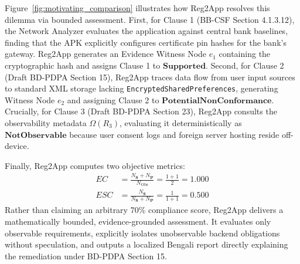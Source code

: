 Figure~\ref{fig:motivating_comparison} illustrates how Reg2App resolves this dilemma via bounded assessment. First, for Clause 1 (BB-CSF Section 4.1.3.12), the Network Analyzer evaluates the application against central bank baselines, finding that the APK explicitly configures certificate pin hashes for the bank's gateway. Reg2App generates an Evidence Witness Node $e_1$ containing the cryptographic hash and assigns Clause 1 to $\mathbf{Supported}$. Second, for Clause 2 (Draft BD-PDPA Section 15), Reg2App traces data flow from user input sources to standard XML storage lacking \texttt{EncryptedSharedPreferences}, generating Witness Node $e_2$ and assigning Clause 2 to $\mathbf{PotentialNonConformance}$. Crucially, for Clause 3 (Draft BD-PDPA Section 23), Reg2App consults the observability metadata $\Omega(R_3)$, evaluating it deterministically as $\mathbf{NotObservable}$ because user consent logs and foreign server hosting reside off-device.

Finally, Reg2App computes two objective metrics:
\begin{align}
\label{eq:motivating:ec}
EC &= \frac{N_{\mathbf{S}} + N_{\mathbf{P}}}{N_{\text{Obs}}} = \frac{1 + 1}{2} = 1.000 \\
\label{eq:motivating:esc}
ESC &= \frac{N_{\mathbf{S}}}{N_{\mathbf{S}} + N_{\mathbf{P}}} = \frac{1}{1 + 1} = 0.500
\end{align}
Rather than claiming an arbitrary 70\% compliance score, Reg2App delivers a mathematically bounded, evidence-grounded assessment. It evaluates only observable requirements, explicitly isolates unobservable backend obligations without speculation, and outputs a localized Bengali report directly explaining the remediation under BD-PDPA Section 15.
